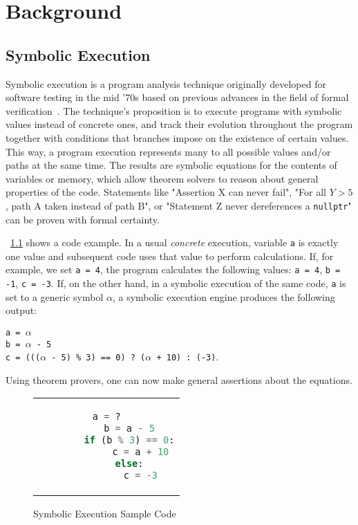 \chapter{Background}

\section{Symbolic Execution}

Symbolic execution is a program analysis technique originally developed for software testing in the mid '70s based on
previous advances in the field of formal verification~\cite{Boyer1975Select, King1975Effigy, Howden1977Dissect}. The
technique's proposition is to execute programs with symbolic values instead of concrete ones, and track their evolution
throughout the program together with conditions that branches impose on the existence of certain values. This way, a
program execution represents many to all possible values and/or paths at the same time. The results are symbolic
equations for the contents of variables or memory, which allow theorem solvers to reason about general properties of the
code. Statements like "Assertion X can never fail", "For all $Y > 5$, path A taken instead of path B", or "Statement Z
never dereferences a \texttt{nullptr}" can be proven with formal certainty.

\lstlistingname~\ref{fig:symbexec_example_listing} shows a code example. In a usual \textit{concrete} execution,
variable \texttt{a} is exactly one value and subsequent code uses that value to perform calculations. If, for example,
we set \texttt{a = 4}, the program calculates the following values: \texttt{a = 4}, \texttt{b = -1}, \texttt{c = -3}.
If, on the other hand, in a symbolic execution of the same code, \texttt{a} is set to a generic symbol $\alpha$, a
symbolic execution engine produces the following output:
\\

\begin{adjustwidth}{3em}{0em}
\texttt{a = $\alpha$}
\\
\texttt{b = $\alpha$ - 5}
\\
\texttt{c = ((($\alpha$ - 5) \% 3) == 0) ? ($\alpha$ + 10) : (-3)}.
\\
\end{adjustwidth}

Using theorem provers, one can now make general assertions about the equations.

\begin{figure}[htbp]
    \centering
    \begin{tabular}{c}
    \begin{lstlisting}[language=Python]
        a = ?
        b = a - 5
        if (b % 3) == 0:
            c = a + 10
        else:
            c = -3
    \end{lstlisting}
    \end{tabular}
    \caption[Symbolic execution example]{Symbolic Execution Sample Code}\label{fig:symbexec_example_listing}
\end{figure}

